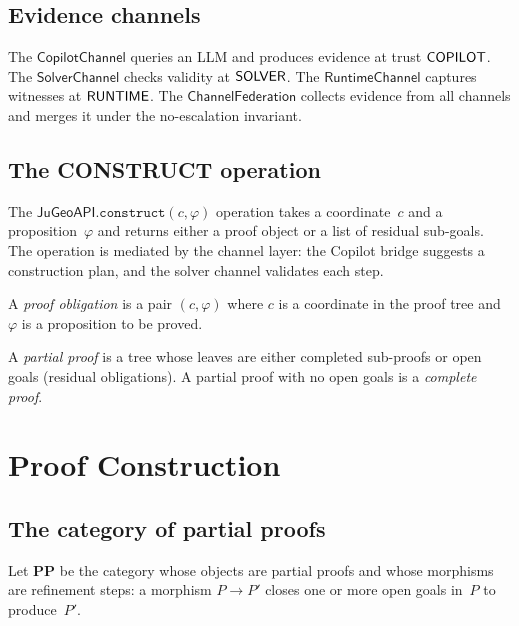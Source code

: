 \documentclass[11pt]{article}
\newcommand{\CopChan}{\mathsf{CopilotChannel}}
\newcommand{\ChanFed}{\mathsf{ChannelFederation}}
\begin{document}
\subsection{Evidence channels}

The $\CopChan$ queries an LLM and produces evidence at
trust $\mathsf{COPILOT}$.  The $\mathsf{SolverChannel}$ checks
validity at $\mathsf{SOLVER}$.  The $\mathsf{RuntimeChannel}$
captures witnesses at $\mathsf{RUNTIME}$.  The $\ChanFed$
collects evidence from all channels and merges it under
the no-escalation invariant.

\subsection{The CONSTRUCT operation}

The $\mathsf{JuGeoAPI}.\texttt{construct}(c, \varphi)$
operation takes a coordinate~$c$ and a proposition~$\varphi$
and returns either a proof object or a list of residual
sub-goals.  The operation is mediated by the channel layer:
the Copilot bridge suggests a construction plan, and the
solver channel validates each step.

\begin{definition}\label{def:proofobligation}
A \emph{proof obligation} is a pair $(c, \varphi)$ where
$c$ is a coordinate in the proof tree and $\varphi$ is
a proposition to be proved.
\end{definition}

\begin{definition}\label{def:partialproof}
A \emph{partial proof} is a tree whose leaves are either
completed sub-proofs or open goals (residual obligations).
A partial proof with no open goals is a \emph{complete proof}.
\end{definition}

\section{Proof Construction}\label{sec:construction}

\subsection{The category of partial proofs}

\begin{definition}\label{def:ppcat}
Let $\mathbf{PP}$ be the category whose objects are partial
proofs and whose morphisms are refinement steps: a morphism
$P \to P'$ closes one or more open goals in~$P$ to produce~$P'$.
\end{definition}
\end{document}

